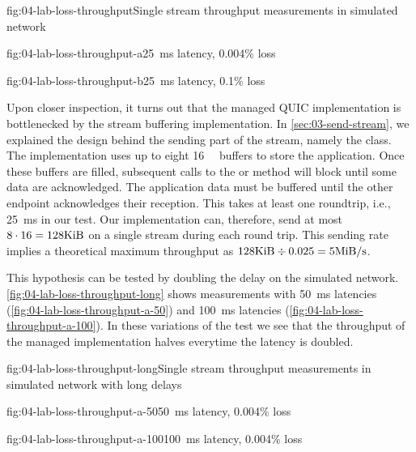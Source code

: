 \begin{myFigure}{fig:04-lab-loss-throughput}{Single stream throughput measurements in simulated network}
\begin{mySubfigure}{0.49\linewidth}{fig:04-lab-loss-throughput-a}{\SI{25}{\milli\second} latency, 0.004\% loss}
\footnotesize

\end{mySubfigure}
\begin{mySubfigure}{0.49\linewidth}{fig:04-lab-loss-throughput-b}{\SI{25}{\milli\second} latency, 0.1\% loss}
\footnotesize

\end{mySubfigure}
\end{myFigure}

Upon closer inspection, it turns out that the managed QUIC implementation is bottlenecked by the
stream buffering implementation. In \autoref{sec:03-send-stream}, we explained the design behind the
sending part of the stream, namely the \SendStream{} class. The implementation uses up to eight
\SI{16}{\kibi\byte} buffers to store the application. Once these buffers are filled, subsequent
calls to the  or  method will block until some data are
acknowledged. The application data must be buffered until the other endpoint acknowledges their
reception. This takes at least one roundtrip, i.e., \SI{25}{\milli\second} in our test. Our
implementation can, therefore, send at most $8 \cdot 16 = 128 \si{\kibi\byte}$ on a single stream during
each round trip. This sending rate implies a theoretical maximum throughput as
$128\si{\kibi\byte} \div 0.025 = 5 \si[per-mode=symbol]{\mebi\byte\per\second}$.

This hypothesis can be tested by doubling the delay on the simulated network.
\autoref{fig:04-lab-loss-throughput-long} shows measurements with \SI{50}{\milli\second} latencies
(\autoref{fig:04-lab-loss-throughput-a-50}) and \SI{100}{\milli\second} latencies
(\autoref{fig:04-lab-loss-throughput-a-100}). In these variations of the test we see that the
throughput of the managed implementation halves everytime the latency is doubled.

\begin{myFigure}{fig:04-lab-loss-throughput-long}{Single stream throughput measurements in simulated network with long delays}
\begin{mySubfigure}{0.49\linewidth}{fig:04-lab-loss-throughput-a-50}{\SI{50}{\milli\second} latency, 0.004\% loss}
\footnotesize

\end{mySubfigure}
\begin{mySubfigure}{0.49\linewidth}{fig:04-lab-loss-throughput-a-100}{\SI{100}{\milli\second} latency, 0.004\% loss}
\footnotesize

\end{mySubfigure}
\end{myFigure}

